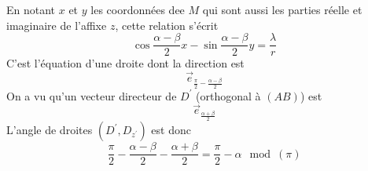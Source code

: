 \begin{enumerate}
En notant $x$ et $y$ les coordonnées dee $M$ qui  sont aussi les parties réelle et imaginaire de l'affixe $z$, cette relation s'écrit
\begin{displaymath}
 \cos \frac{\alpha - \beta}{2}x -\sin \frac{\alpha - \beta}{2}y = \frac{\lambda}{r}
\end{displaymath}
C'est l'équation d'une droite dont la direction est
\begin{displaymath}
\overrightarrow{e}_{ \frac{\pi}{2}-\frac{\alpha - \beta}{2}}
\end{displaymath}
On a vu qu'un vecteur directeur de $D^\prime$ (orthogonal à $(AB)$) est 
\begin{displaymath}
 \overrightarrow{e}_{\frac{\alpha + \beta}{2}}
\end{displaymath}
L'angle de droites $(D^\prime , D_{z^\prime})$ est donc
\begin{displaymath}
 \frac{\pi}{2}-\frac{\alpha - \beta}{2} - \frac{\alpha + \beta}{2} = \frac{\pi}{2} -\alpha   \mod(\pi)
\end{displaymath}

\end{enumerate}
